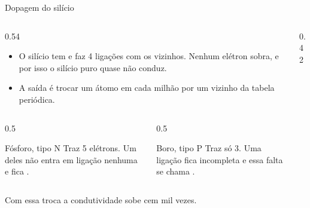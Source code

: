 \begin{frame}{Dopagem do silício}
  \begin{columns}[T]
    \begin{column}{0.54\linewidth}
      \begin{itemize}\small
        \item O silício tem  e faz 4 ligações
              com os vizinhos. Nenhum elétron sobra, e por isso o silício puro
              quase não conduz.
        \item A saída é trocar \alert{um átomo em cada milhão} por um vizinho
              da tabela periódica.
      \end{itemize}
      \vspace{0.2cm}
      \begin{columns}[T]
        \begin{column}{0.5\linewidth}
          \begin{block}{Fósforo, tipo N}
            \scriptsize Traz 5 elétrons. Um deles não entra em ligação
            nenhuma e fica .
          \end{block}
        \end{column}
        \begin{column}{0.5\linewidth}
          \begin{block}{Boro, tipo P}
            \scriptsize Traz só 3. Uma ligação fica incompleta e essa falta
            se chama .
          \end{block}
        \end{column}
      \end{columns}
    \end{column}
    \begin{column}{0.42\linewidth}
      \centering
    \end{column}
  \end{columns}
  \vspace{0.2cm}
  \centering\small
  Com essa troca a condutividade sobe \alert{cem mil vezes}.
\end{frame}


